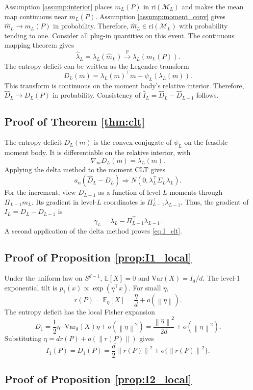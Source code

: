 \documentclass[twoside]{article}
\theoremstyle{definition}
\theoremstyle{remark}
\newcommand{\M}{\mathcal M}
\newcommand{\E}{\mathbb E}
\newcommand{\ri}{\mathrm{ri}}
\newcommand{\norm}[1]{\left\lVert #1\right\rVert}
\begin{document}
Assumption \ref{assump:interior} places $m_L(P)$ in $\ri(\M_L)$ and makes the mean map continuous near $m_L(P)$. Assumption \ref{assump:moment_conv} gives $\widehat m_L\to m_L(P)$ in probability. Therefore, $\widehat m_L\in\ri(\M_L)$ with probability tending to one. Consider all plug-in quantities on this event. The continuous mapping theorem gives
\[
  \widehat\lambda_L=\lambda_L(\widehat m_L)\xrightarrow{p}\lambda_L(m_L(P)).
\]
The entropy deficit can be written as the Legendre transform
\[
  D_L(m)=\lambda_L(m)^\top m-\psi_L(\lambda_L(m)).
\]
This transform is continuous on the moment body's relative interior. Therefore, $\widehat D_L\to D_L(P)$ in probability. Consistency of $\widehat I_L=\widehat D_L-\widehat D_{L-1}$ follows.

\subsection{Proof of Theorem \ref{thm:clt}}

The entropy deficit $D_L(m)$ is the convex conjugate of $\psi_L$ on the feasible moment body. It is differentiable on the relative interior, with
\[
  \nabla_mD_L(m)=\lambda_L(m).
\]
Applying the delta method to the moment CLT gives
\[
  a_n(\widehat D_L-D_L)
  \Rightarrow N(0,\lambda_L^\top\Sigma_L\lambda_L).
\]
For the increment, view $D_{L-1}$ as a function of level-$L$ moments through $\Pi_{L-1}m_L$. Its gradient in level-$L$ coordinates is $\Pi_{L-1}^\top\lambda_{L-1}$. Thus, the gradient of $I_L=D_L-D_{L-1}$ is
\[
  \gamma_L=\lambda_L-\Pi_{L-1}^\top\lambda_{L-1}.
\]
A second application of the delta method proves \eqref{eq:I_clt}.



\subsection{Proof of Proposition \ref{prop:I1_local}}

Under the uniform law on $S^{d-1}$, $\E[X]=0$ and $\mathrm{Var}(X)=I_d/d$. The level-1 exponential tilt is $p_1(x)\propto\exp(\eta^\top x)$. For small $\eta$,
\[
  r(P)=\E_\eta[X]=\frac{\eta}{d}+o(\norm{\eta}).
\]
The entropy deficit has the local Fisher expansion
\[
  D_1=\frac12\eta^\top \mathrm{Var}_0(X)\eta+o(\norm{\eta}^2)
  =\frac{\norm{\eta}^2}{2d}+o(\norm{\eta}^2).
\]
Substituting $\eta=d r(P)+o(\norm{r(P)})$ gives
\[
  I_1(P)=D_1(P)=\frac d2\norm{r(P)}^2+o\{\norm{r(P)}^2\}.
\]

\subsection{Proof of Proposition \ref{prop:I2_local}}
\end{document}
